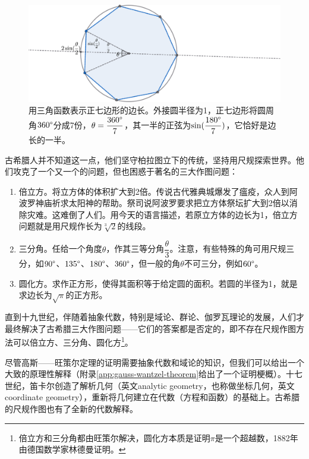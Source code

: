 \documentclass[b5paper]{ctexart}
\begin{document}
\begin{figure}[htbp]
 \centering
 \includegraphics[scale=0.35]{img/heptagon}
 \caption{用三角函数表示正七边形的边长。外接圆半径为1，正七边形将圆周角$360\degree$分成7份，$\theta = \dfrac{360\degree}{7}$，其一半的正弦为$\sin(\dfrac{180\degree}{7})$，它恰好是边长的一半。}
 \label{fig:heptagon}
\end{figure}

古希腊人并不知道这一点，他们坚守柏拉图立下的传统，坚持用尺规探索世界。他们攻克了一个又一个的问题，但也困惑于著名的三大作图问题：

\begin{enumerate}[(1)]
\item 倍立方。将立方体的体积扩大到2倍。传说古代雅典城爆发了瘟疫，众人到阿波罗神庙祈求太阳神的帮助。祭司说阿波罗要求把立方体祭坛扩大到2倍以消除灾难。这难倒了人们。用今天的语言描述，若原立方体的边长为1，倍立方问题就是用尺规作长为$\sqrt[3]{2}$的线段。

\item 三分角。任给一个角度$\theta$，作其三等分角$\dfrac{\theta}{3}$。注意，有些特殊的角可用尺规三分，如$90\degree$、$135\degree$、$180\degree$、$360\degree$，但一般的角$\theta$不可三分，例如$60\degree$。

\item 圆化方。求作正方形，使得其面积等于给定圆的面积。若圆的半径为1，就是求边长为$\sqrt{\pi}$的正方形。
\end{enumerate}

直到十九世纪，伴随着抽象代数，特别是域论、群论、伽罗瓦理论的发展，人们才最终解决了古希腊三大作图问题——它们的答案都是否定的，即不存在尺规作图方法可以倍立方、三分角、圆化方\footnote{倍立方和三分角都由旺策尔解决，圆化方本质是证明$\pi$是一个超越数，1882年由德国数学家林德曼证明。}。

尽管高斯——旺策尔定理的证明需要抽象代数和域论的知识，但我们可以给出一个大致的原理性解释（附录\ref{app:gauss-wantzel-theorem}给出了一个证明梗概）。十七世纪，笛卡尔创造了解析几何（英文analytic geometry，也称做坐标几何，英文coordinate geometry），重新将几何建立在代数（方程和函数）的基础上。古希腊的尺规作图也有了全新的代数解释。
\end{document}

